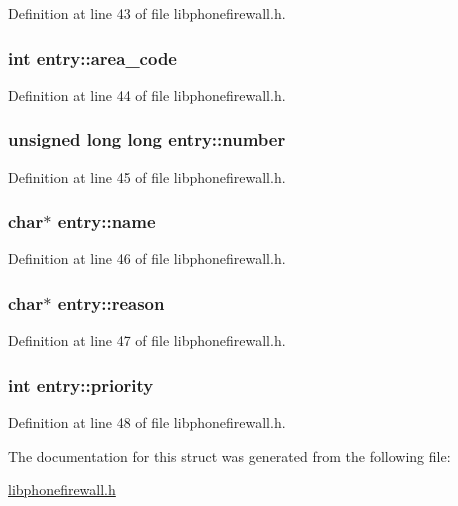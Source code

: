 Definition at line 43 of file libphonefirewall.h.\hypertarget{structentry_0e8fbe135bf7735f8675b6829ac943c3}{
\subsubsection{\setlength{\rightskip}{0pt plus 5cm}int {\bf entry::area\_\-code}}}
\label{structentry_0e8fbe135bf7735f8675b6829ac943c3}




Definition at line 44 of file libphonefirewall.h.\hypertarget{structentry_ba7411d38f6779700ca594ebb2db3201}{
\subsubsection{\setlength{\rightskip}{0pt plus 5cm}unsigned long long {\bf entry::number}}}
\label{structentry_ba7411d38f6779700ca594ebb2db3201}




Definition at line 45 of file libphonefirewall.h.\hypertarget{structentry_ef8962564a1a313a7ddc320bb4ed739c}{
\subsubsection{\setlength{\rightskip}{0pt plus 5cm}char$\ast$ {\bf entry::name}}}
\label{structentry_ef8962564a1a313a7ddc320bb4ed739c}




Definition at line 46 of file libphonefirewall.h.\hypertarget{structentry_1bcaeeed116744379db6ff5c671856a2}{
\subsubsection{\setlength{\rightskip}{0pt plus 5cm}char$\ast$ {\bf entry::reason}}}
\label{structentry_1bcaeeed116744379db6ff5c671856a2}




Definition at line 47 of file libphonefirewall.h.\hypertarget{structentry_65a11c5accccc3ac72247a12d53098d1}{
\subsubsection{\setlength{\rightskip}{0pt plus 5cm}int {\bf entry::priority}}}
\label{structentry_65a11c5accccc3ac72247a12d53098d1}




Definition at line 48 of file libphonefirewall.h.

The documentation for this struct was generated from the following file:\begin{CompactItemize}
\item 
\hyperlink{libphonefirewall_8h}{libphonefirewall.h}\end{CompactItemize}
